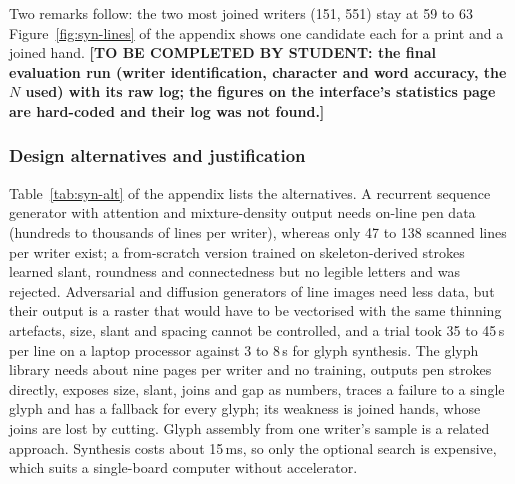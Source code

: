 Two remarks follow: the two most joined writers (151, 551) stay at 59 to 63\,%
Figure~\ref{fig:syn-lines} of the appendix shows one candidate each for a print and a joined hand.
\textbf{[TO BE COMPLETED BY STUDENT: the final evaluation run (writer identification, character and word accuracy, the $N$ used) with its raw log; the figures on the interface's statistics page are hard-coded and their log was not found.]}

\subsubsection{Design alternatives and justification}

Table~\ref{tab:syn-alt} of the appendix lists the alternatives.
A recurrent sequence generator with attention and mixture-density output \cite{graves2013} needs on-line pen data (hundreds to thousands of lines per writer), whereas only 47 to 138 scanned lines per writer exist; a from-scratch version trained on skeleton-derived strokes learned slant, roundness and connectedness but no legible letters and was rejected.
Adversarial and diffusion generators of line images \cite{kang2020,dai2024} need less data, but their output is a raster that would have to be vectorised with the same thinning artefacts, size, slant and spacing cannot be controlled, and a trial took 35 to 45\,s per line on a laptop processor against 3 to 8\,s for glyph synthesis.
The glyph library needs about nine pages per writer and no training, outputs pen strokes directly, exposes size, slant, joins and gap as numbers, traces a failure to a single glyph and has a fallback for every glyph; its weakness is joined hands, whose joins are lost by cutting.
Glyph assembly from one writer's sample \cite{haines2016} is a related approach.
Synthesis costs about 15\,ms, so only the optional search is expensive, which suits a single-board computer without accelerator.
